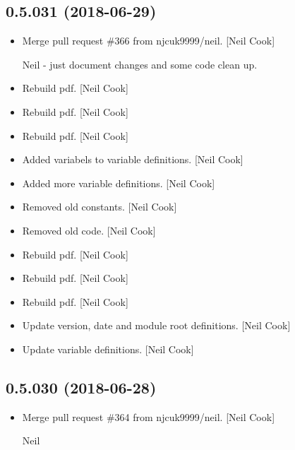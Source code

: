 \documentclass[a4paper,10pt,english]{report}
\begin{document}
\subsection{0.5.031 (2018-06-29)}
\label{\detokenize{misc/changelog:id404}}\begin{itemize}
\item {} 
Merge pull request \#366 from njcuk9999/neil. {[}Neil Cook{]}

Neil - just document changes and some code clean up.

\item {} 
Rebuild pdf. {[}Neil Cook{]}

\item {} 
Rebuild pdf. {[}Neil Cook{]}

\item {} 
Rebuild pdf. {[}Neil Cook{]}

\item {} 
Added variabels to  variable definitions. {[}Neil Cook{]}

\item {} 
Added more  variable definitions. {[}Neil Cook{]}

\item {} 
Removed old  constants. {[}Neil Cook{]}

\item {} 
Removed old  code. {[}Neil Cook{]}

\item {} 
Rebuild pdf. {[}Neil Cook{]}

\item {} 
Rebuild pdf. {[}Neil Cook{]}

\item {} 
Rebuild pdf. {[}Neil Cook{]}

\item {} 
Update version, date and module root definitions. {[}Neil Cook{]}

\item {} 
Update variable definitions. {[}Neil Cook{]}

\end{itemize}


\subsection{0.5.030 (2018-06-28)}
\label{\detokenize{misc/changelog:id405}}\begin{itemize}
\item {} 
Merge pull request \#364 from njcuk9999/neil. {[}Neil Cook{]}

Neil

\end{itemize}
\end{document}
